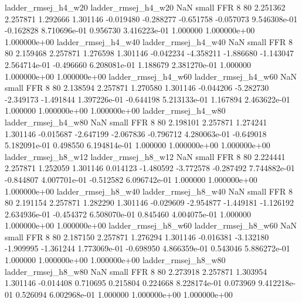      ladder_rmsej_h4_w20      ladder_rmsej_h4_w20                   NaN      small      FFR                 8 80 2.251362       2.257871 1.292666       1.301146   -0.019480     -0.288277     -0.651758    -0.057073   9.546308e-01 -0.162828 8.710696e-01     0.956730   3.416223e-01            1.000000    1.000000e+00        1.000000e+00
     ladder_rmsej_h4_w40      ladder_rmsej_h4_w40                   NaN      small      FFR                 8 80 2.159468       2.257871 1.276598       1.301146   -0.042234     -4.358211     -1.886680    -1.143047   2.564714e-01 -0.496660 6.208081e-01     1.188679   2.381270e-01            1.000000    1.000000e+00        1.000000e+00
     ladder_rmsej_h4_w60      ladder_rmsej_h4_w60                   NaN      small      FFR                 8 80 2.138594       2.257871 1.270580       1.301146   -0.044206     -5.282730     -2.349173    -1.491844   1.397226e-01 -0.644198 5.213133e-01     1.167894   2.463622e-01            1.000000    1.000000e+00        1.000000e+00
     ladder_rmsej_h4_w80      ladder_rmsej_h4_w80                   NaN      small      FFR                 8 80 2.198101       2.257871 1.274241       1.301146   -0.015687     -2.647199     -2.067836    -0.796712   4.280063e-01 -0.649018 5.182091e-01     0.498550   6.194814e-01            1.000000    1.000000e+00        1.000000e+00
     ladder_rmsej_h8_w12      ladder_rmsej_h8_w12                   NaN      small      FFR                 8 80 2.224441       2.257871 1.252059       1.301146    0.014123     -1.480592     -3.772578    -0.287492   7.744882e-01 -0.844807 4.007701e-01    -0.512582   6.096742e-01            1.000000    1.000000e+00        1.000000e+00
     ladder_rmsej_h8_w40      ladder_rmsej_h8_w40                   NaN      small      FFR                 8 80 2.191154       2.257871 1.282290       1.301146   -0.029609     -2.954877     -1.449181    -1.126192   2.634936e-01 -0.454372 6.508070e-01     0.845460   4.004075e-01            1.000000    1.000000e+00        1.000000e+00
     ladder_rmsej_h8_w60      ladder_rmsej_h8_w60                   NaN      small      FFR                 8 80 2.187150       2.257871 1.276294       1.301146   -0.016381     -3.132180     -1.909995    -1.361244   1.773069e-01 -0.698950 4.866359e-01     0.543046   5.886272e-01            1.000000    1.000000e+00        1.000000e+00
     ladder_rmsej_h8_w80      ladder_rmsej_h8_w80                   NaN      small      FFR                 8 80 2.273918       2.257871 1.303954       1.301146   -0.014408      0.710695      0.215804     0.224668   8.228174e-01  0.073969 9.412218e-01     0.526094   6.002968e-01            1.000000    1.000000e+00        1.000000e+00
